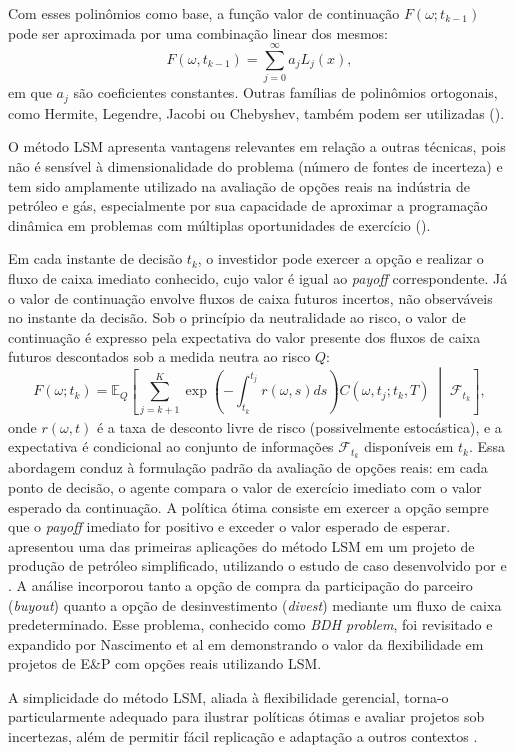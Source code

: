 Com esses polinômios como base, a função valor de continuação $F(\omega; t_{k-1})$ pode ser aproximada por uma combinação linear dos mesmos:
\begin{equation}
F(\omega, t_{k-1}) = \sum_{j=0}^{\infty} a_j L_j(x),
\end{equation}
em que $a_j$ são coeficientes constantes. Outras famílias de polinômios ortogonais, como Hermite, Legendre, Jacobi ou Chebyshev, também podem ser utilizadas (\cite{25}).

O método LSM apresenta vantagens relevantes em relação a outras técnicas, pois não é sensível à dimensionalidade do problema (número de fontes de incerteza) e tem sido amplamente utilizado na avaliação de opções reais na indústria de petróleo e gás, especialmente por sua capacidade de aproximar a programação dinâmica em problemas com múltiplas oportunidades de exercício (\cite{26}).

Em cada instante de decisão $t_k$, o investidor pode exercer a opção e realizar o fluxo de caixa imediato conhecido, cujo valor é igual ao \textit{payoff} correspondente. Já o valor de continuação envolve fluxos de caixa futuros incertos, não observáveis no instante da decisão. Sob o princípio da neutralidade ao risco, o valor de continuação é expresso pela expectativa do valor presente dos fluxos de caixa futuros descontados sob a medida neutra ao risco $Q$:
\begin{equation}
F(\omega; t_k) =
\mathbb{E}_Q \left[
\sum_{j=k+1}^{K}
\exp\left(-\int_{t_k}^{t_j} r(\omega,s) ds\right)
C(\omega, t_j; t_k, T)
\; \middle| \;
\mathcal{F}_{t_k}
\right],
\end{equation}
onde $r(\omega,t)$ é a taxa de desconto livre de risco (possivelmente estocástica), e a expectativa é condicional ao conjunto de informações $\mathcal{F}_{t_k}$ disponíveis em $t_k$. Essa abordagem conduz à formulação padrão da avaliação de opções reais: em cada ponto de decisão, o agente compara o valor de exercício imediato com o valor esperado da continuação. A política ótima consiste em exercer a opção sempre que o \textit{payoff} imediato for positivo e exceder o valor esperado de esperar. \cite{27} apresentou uma das primeiras aplicações do método LSM em um projeto de produção de petróleo simplificado, utilizando o estudo de caso desenvolvido por \cite{19} e \cite{28}. A análise incorporou tanto a opção de compra da participação do parceiro (\textit{buyout}) quanto a opção de desinvestimento (\textit{divest}) mediante um fluxo de caixa predeterminado. Esse problema, conhecido como \textit{BDH problem}, foi revisitado e expandido por Nascimento et al em \cite{29} demonstrando o valor da flexibilidade em projetos de E\&P com opções reais utilizando LSM.

A simplicidade do método LSM, aliada à flexibilidade gerencial, torna-o particularmente adequado para ilustrar políticas ótimas e avaliar projetos sob incertezas, além de permitir fácil replicação e adaptação a outros contextos \cite{26}.
















